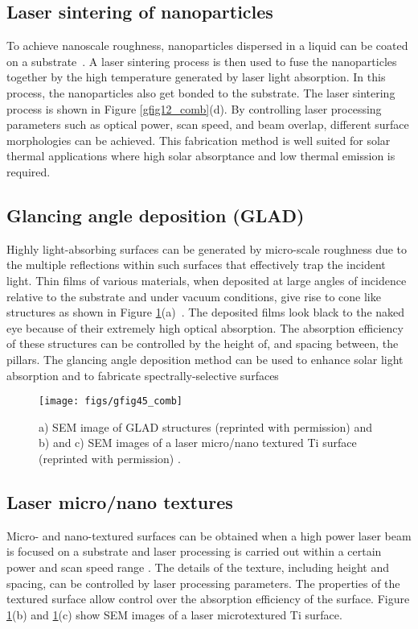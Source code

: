 \documentclass[10pt,letterpaper]{article}
\begin{document}
{\subsection{Laser sintering of nanoparticles}
To achieve nanoscale roughness, nanoparticles dispersed in a liquid can be coated on a substrate~\cite{LaserProcessing}. A laser sintering process is then used to fuse the nanoparticles together by the high temperature generated by laser light absorption. In this process, the nanoparticles also get bonded to the substrate. The laser sintering process is shown in Figure \ref{gfig12_comb}(d).  By controlling laser processing parameters such as optical power, scan speed, and beam overlap, different surface morphologies can be achieved. This fabrication method is well suited for solar thermal applications where high solar absorptance and low thermal emission is required.

\subsection{Glancing angle deposition (GLAD)}
Highly light-absorbing surfaces can be generated by micro-scale roughness 
due to the multiple reflections within such surfaces that effectively trap the incident light.  
Thin films of various materials, when deposited at large angles of incidence
relative to the substrate and under vacuum conditions, give rise to cone like 
structures as shown in Figure \ref{gfig45_comb}(a)~\cite{GlancingAngle}. The deposited films look black to the 
naked eye because of their extremely high optical absorption.  The absorption efficiency of 
these structures can be controlled by the height of, and spacing between, the pillars.  
The glancing angle deposition method can be used to enhance solar light absorption 
and to fabricate spectrally-selective surfaces

\begin{figure}[h]
	\texttt{[image: figs/gfig45\_comb]}
	\caption{\label{gfig45_comb} a) SEM image of GLAD structures (reprinted with permission) \cite{gfig4ref} and b) and c) SEM images of a laser micro/nano textured Ti surface (reprinted with permission) \cite{g28}.} %
\end{figure} 

\subsection{Laser micro/nano textures}
Micro- and nano-textured surfaces can be obtained when a high power laser beam is 
focused on a substrate and laser processing is carried out within a certain power 
and scan speed range \cite{g28}.  The details of the texture, including height and spacing, can be controlled by laser processing parameters.  The properties of the textured surface allow control over the absorption efficiency of the surface. Figure \ref{gfig45_comb}(b) and \ref{gfig45_comb}(c) show SEM images of a laser microtextured Ti surface. 

}
\end{document}
